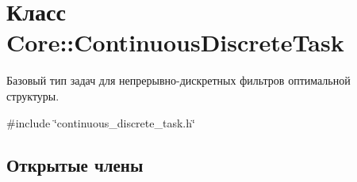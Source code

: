 \hypertarget{class_core_1_1_continuous_discrete_task}{}\section{Класс Core\+:\+:Continuous\+Discrete\+Task}
\label{class_core_1_1_continuous_discrete_task}


Базовый тип задач для непрерывно-\/дискретных фильтров оптимальной структуры.  




{\ttfamily \#include \char`\"{}continuous\+\_\+discrete\+\_\+task.\+h\char`\"{}}

\subsection*{Открытые члены}
